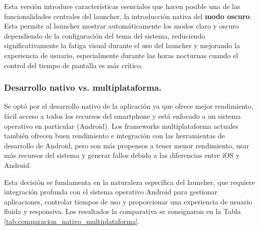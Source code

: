 Esta versión introduce características esenciales que hacen posible una de las funcionalidades centrales del launcher, la introducción nativa del \textbf{modo oscuro}. Esta permite al launcher mostrar automáticamente los modos claro y oscuro dependiendo de la configuración del tema del sistema, reduciendo significativamente la fatiga visual durante el uso del launcher y mejorando la experiencia de usuario, especialmente durante las horas nocturnas cuando el control del tiempo de pantalla es más crítico. 


\subsubsection{Desarrollo nativo vs. multiplataforma.}

Se optó por el desarrollo nativo de la aplicación ya que ofrece mejor rendimiento, fácil acceso a todos los recursos del smartphone y está enfocado a un sistema operativo en particular (Android). Los frameworks multiplataforma actuales también ofrecen buen rendimiento e integración con las herramientas de desarrollo de Android, pero son más propensos a tener menor rendimiento, usar más recursos del sistema y generar fallos debido a las diferencias entre iOS y Android.

Esta decisión se fundamenta en la naturaleza específica del launcher, que requiere integración profunda con el sistema operativo Android para gestionar aplicaciones, controlar tiempos de uso y proporcionar una experiencia de usuario fluida y responsiva. Los resultados la comparativa se consignaron en la Tabla \ref{tab:comparacion_nativo_multiplataforma}.

